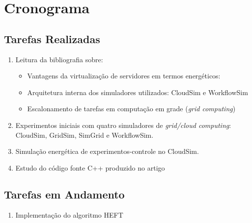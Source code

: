 \chapter{Cronograma}
\label{cap:cronograma}

\section{Tarefas Realizadas}
	\label{sec:tarefas_realizadas}
	\begin{enumerate}
		\item Leitura da bibliografia sobre:
		\begin{itemize}
			\item Vantagens da virtualização de servidores em termos energéticos:
				\cite{barroso:case_energy_proportional}
				\cite{beloglazov:energy_efficient_allocation_virtual_machines}
				\cite{berl:energy_efficient_cloud_computing}
				\cite{feng:green500_encouraging_sustainable_supercomputing}
				\cite{murugesan:harnessing_green_it}
				\cite{vmware:virtualization_right_sizes_it}
				\cite{rivoire:models_metrics_enable_energy_efficient_optimizations}
			\item Arquitetura interna dos simuladores utilizados: CloudSim e WorkflowSim
				\cite{calheiros:cloudsim}
				\cite{chen:workflowsim}
			\item Escalonamento de tarefas em computação em grade (\emph{grid 
			computing})
				\cite{chaves:scheduling_software_requirements}
				\cite{batista:embedding_software_requirements}
		\end{itemize}
		\item Experimentos iniciais com quatro simuladores de \emph{grid/cloud
			computing}: CloudSim, GridSim, SimGrid e WorkflowSim.
		\item Simulação energética de experimentos-controle no CloudSim.
		\item Estudo do código fonte C++ produzido no artigo
			\cite{chaves:scheduling_software_requirements} 
	\end{enumerate}

\section{Tarefas em Andamento}
\label{sec:tarefas_andamento}
	\begin{enumerate}
		\item Implementação do algoritmo HEFT
	\end{enumerate}

